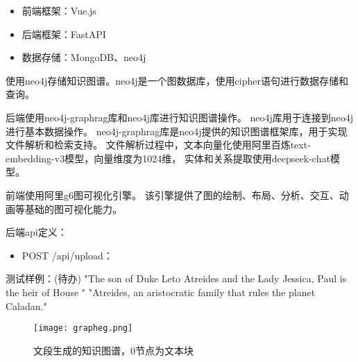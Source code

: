 \documentclass{xmu}
\begin{document}
        \begin{itemize}
            \item 前端框架：Vue.js
            \item 后端框架：FastAPI
            \item 数据存储：MongoDB、neo4j
        \end{itemize}
        使用neo4j存储知识图谱。neo4j是一个图数据库，使用cipher语句进行数据存储和查询。\par
        后端使用neo4j-graphrag库和neo4j库进行知识图谱操作。
        neo4j库用于连接到neo4j进行基本数据操作。
        neo4j-graphrag库是neo4j提供的知识图谱框架库，用于实现文件解析和检索支持。
        文件解析过程中，文本向量化使用阿里百炼text-embedding-v3模型，向量维度为1024维，
        实体和关系提取使用deepseek-chat模型。

        前端使用阿里g6图可视化引擎。
        该引擎提供了图的绘制、布局、分析、交互、动画等基础的图可视化能力。

        后端api定义：
        \begin{itemize}
            \item POST /api/upload：
        \end{itemize}

        测试样例：(待办)
        "The son of Duke Leto Atreides and the Lady Jessica, Paul is the heir of House "
        "Atreides, an aristocratic family that rules the planet Caladan."
        \begin{figure}[!htb]
            \centering
            \texttt{[image: grapheg.png]}\\
            \caption{文段生成的知识图谱，0节点为文本块}\label{}
        \end{figure}
\end{document}
